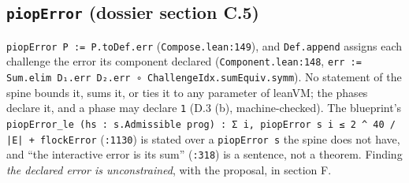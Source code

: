 \subsection{\texttt{piopError} (dossier section C.5)}\label{sec:gen-spine-C5}

\texttt{piopError P := P.\allowbreak{}toDef.\allowbreak{}err} (\texttt{Compose.\allowbreak{}lean:149}), and \texttt{Def.\allowbreak{}append} assigns each challenge the error its component declared (\texttt{Component.\allowbreak{}lean:148}, \texttt{e\allowbreak{}r\allowbreak{}r\allowbreak{} :\allowbreak{}=\allowbreak{} S\allowbreak{}u\allowbreak{}m\allowbreak{}.\allowbreak{}e\allowbreak{}l\allowbreak{}i\allowbreak{}m\allowbreak{} D\allowbreak{}₁\allowbreak{}.\allowbreak{}e\allowbreak{}r\allowbreak{}r\allowbreak{} D\allowbreak{}₂\allowbreak{}.\allowbreak{}e\allowbreak{}r\allowbreak{}r\allowbreak{} ∘\allowbreak{} C\allowbreak{}h\allowbreak{}a\allowbreak{}l\allowbreak{}l\allowbreak{}e\allowbreak{}n\allowbreak{}g\allowbreak{}e\allowbreak{}I\allowbreak{}d\allowbreak{}x\allowbreak{}.\allowbreak{}s\allowbreak{}u\allowbreak{}m\allowbreak{}E\allowbreak{}q\allowbreak{}u\allowbreak{}i\allowbreak{}v\allowbreak{}.\allowbreak{}s\allowbreak{}y\allowbreak{}m\allowbreak{}m}). No statement of the spine bounds it, sums it, or ties it to any parameter of leanVM; the phases declare it, and a phase may declare \texttt{1} (D.3 (b), machine-checked). The blueprint's \texttt{p\allowbreak{}i\allowbreak{}o\allowbreak{}p\allowbreak{}E\allowbreak{}r\allowbreak{}r\allowbreak{}o\allowbreak{}r\allowbreak{}\_\allowbreak{}l\allowbreak{}e\allowbreak{} (\allowbreak{}h\allowbreak{}s\allowbreak{} :\allowbreak{} s\allowbreak{}.\allowbreak{}A\allowbreak{}d\allowbreak{}m\allowbreak{}i\allowbreak{}s\allowbreak{}s\allowbreak{}i\allowbreak{}b\allowbreak{}l\allowbreak{}e\allowbreak{} p\allowbreak{}r\allowbreak{}o\allowbreak{}g\allowbreak{})\allowbreak{} :\allowbreak{} Σ\allowbreak{} i\allowbreak{},\allowbreak{} p\allowbreak{}i\allowbreak{}o\allowbreak{}p\allowbreak{}E\allowbreak{}r\allowbreak{}r\allowbreak{}o\allowbreak{}r\allowbreak{} s\allowbreak{} i\allowbreak{} ≤\allowbreak{} 2\allowbreak{} \textasciicircum{}\allowbreak{} 4\allowbreak{}0\allowbreak{} /\allowbreak{} |\allowbreak{}E\allowbreak{}|\allowbreak{} +\allowbreak{} f\allowbreak{}l\allowbreak{}o\allowbreak{}c\allowbreak{}k\allowbreak{}E\allowbreak{}r\allowbreak{}r\allowbreak{}o\allowbreak{}r} (\texttt{:1130}) is stated over a \texttt{piopError s} the spine does not have, and \enquote{the interactive error is its sum} (\texttt{:318}) is a sentence, not a theorem. Finding \emph{the declared error is unconstrained}, with the proposal, in section F.

